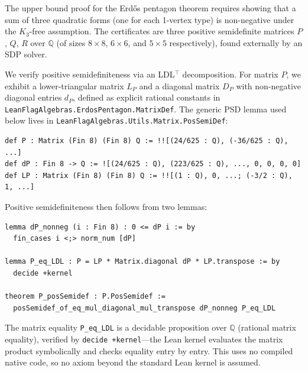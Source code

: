 \documentclass{article}
\newcommand{\Q}{\mathbb{Q}}
\newcommand{\lean}[1]{\texttt{#1}}
\begin{document}
The upper bound proof for the Erd\H{o}s pentagon theorem requires showing
that a sum of three quadratic forms (one for each 1-vertex type) is
non-negative under the $K_3$-free assumption.  The certificates are three
positive semidefinite matrices $P$, $Q$, $R$ over $\Q$ (of sizes
$8 \times 8$, $6 \times 6$, and $5 \times 5$ respectively),
found externally by an SDP solver.

We verify positive semidefiniteness via an LDL$^\top$ decomposition.  For
matrix $P$, we exhibit a lower-triangular matrix $L_P$ and a diagonal matrix
$D_P$ with non-negative diagonal entries $d_P$, defined as explicit rational
constants in \lean{LeanFlagAlgebras.ErdosPentagon.MatrixDef}.  The generic PSD
lemma used below lives in \lean{LeanFlagAlgebras.Utils.Matrix.PosSemiDef}:
\begin{lstlisting}
def P : Matrix (Fin 8) (Fin 8) Q := !![(24/625 : Q), (-36/625 : Q), ...]
def dP : Fin 8 -> Q := ![(24/625 : Q), (223/625 : Q), ..., 0, 0, 0, 0]
def LP : Matrix (Fin 8) (Fin 8) Q := !![(1 : Q), 0, ...; (-3/2 : Q), 1, ...]
\end{lstlisting}
Positive semidefiniteness then follows from two lemmas:
\begin{lstlisting}
lemma dP_nonneg (i : Fin 8) : 0 <= dP i := by
  fin_cases i <;> norm_num [dP]

lemma P_eq_LDL : P = LP * Matrix.diagonal dP * LP.transpose := by
  decide +kernel

theorem P_posSemidef : P.PosSemidef :=
  posSemidef_of_eq_mul_diagonal_mul_transpose dP_nonneg P_eq_LDL
\end{lstlisting}
The matrix equality \lean{P\_eq\_LDL} is a decidable proposition over $\Q$
(rational matrix equality), verified by \lean{decide +kernel}---the Lean
kernel evaluates the matrix product symbolically and checks equality entry by
entry.  This uses no compiled native code, so no axiom beyond the standard
Lean kernel is assumed.
\end{document}
